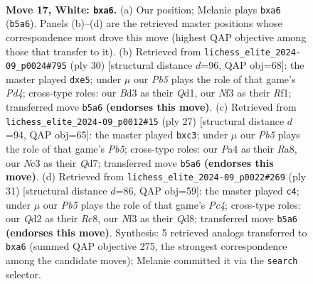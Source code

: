 \documentclass[11pt]{article}
\begin{document}
\clearpage

\begin{figure}[p]\centering
\begin{subfigure}{0.46\textwidth}\centering
\resizebox{\linewidth}{!}{%
\newchessgame
\chessboard[
  setfen={1nb2rk1/r3qpp1/pp1p1n2/1P2p2p/P3P3/2NB1N2/2PQ1PPP/R4RK1 w - - 1 17},
  showmover=false,
  pgfstyle=straightmove, color=movearrow, markmove={b5-a6}
]}
\caption{}
\end{subfigure}\hfill
\begin{subfigure}{0.46\textwidth}\centering
\resizebox{\linewidth}{!}{%
\newchessgame
\chessboard[
  setfen={r1b2rk1/pp4np/2nq1pp1/3pp3/3P4/2PN1N2/PP2BPPP/R2Q1RK1 w - - 0 16},
  showmover=false,
  pgfstyle=straightmove, color=movearrow, markmove={d4-e5}
]}
\caption{}
\end{subfigure}
\\[4pt]
\begin{subfigure}{0.46\textwidth}\centering
\resizebox{\linewidth}{!}{%
\newchessgame
\chessboard[
  setfen={r4rk1/3q1ppp/p1nbpn2/3p4/1p1P1P2/2PB1N2/PP2Q1PP/R1B2RK1 b - - 1 14},
  showmover=false,
  pgfstyle=straightmove, color=movearrow, markmove={b4-c3}
]}
\caption{}
\end{subfigure}\hfill
\begin{subfigure}{0.46\textwidth}\centering
\resizebox{\linewidth}{!}{%
\newchessgame
\chessboard[
  setfen={2rq1rk1/3nbppp/1p2pn2/2pp4/3P1B2/2N1PN1P/PP2QPP1/R4RK1 b - - 1 16},
  showmover=false,
  pgfstyle=straightmove, color=movearrow, markmove={c5-c4}
]}
\caption{}
\end{subfigure}
\caption{\textbf{Move 17, White: \texttt{bxa6}.} (a) Our position; Melanie plays \texttt{bxa6} (\texttt{b5a6}). Panels (b)--(d) are the retrieved master positions whose correspondence most drove this move (highest QAP objective among those that transfer to it). (b) Retrieved from \texttt{lichess\_elite\_2024-09\_p0024\#795} (ply 30) [structural distance $d$=96, QAP obj=68]: the master played \texttt{dxe5}; under $\mu$ our \emph{Pb5} plays the role of that game's \emph{Pd4}; cross-type roles: our \emph{B}d3 as their \emph{Q}d1, our \emph{N}f3 as their \emph{R}f1; transferred move \texttt{b5a6} \textbf{(endorses this move)}. (c) Retrieved from \texttt{lichess\_elite\_2024-09\_p0012\#15} (ply 27) [structural distance $d$=94, QAP obj=65]: the master played \texttt{bxc3}; under $\mu$ our \emph{Pb5} plays the role of that game's \emph{Pb5}; cross-type roles: our \emph{P}a4 as their \emph{R}a8, our \emph{N}c3 as their \emph{Q}d7; transferred move \texttt{b5a6} \textbf{(endorses this move)}. (d) Retrieved from \texttt{lichess\_elite\_2024-09\_p0022\#269} (ply 31) [structural distance $d$=86, QAP obj=59]: the master played \texttt{c4}; under $\mu$ our \emph{Pb5} plays the role of that game's \emph{Pc4}; cross-type roles: our \emph{Q}d2 as their \emph{R}c8, our \emph{N}f3 as their \emph{Q}d8; transferred move \texttt{b5a6} \textbf{(endorses this move)}. Synthesis: 5 retrieved analogs transferred to \texttt{bxa6} (summed QAP objective 275, the strongest correspondence among the candidate moves); Melanie committed it via the \texttt{search} selector.}
\label{fig:thought-m32}
\end{figure}
\end{document}
